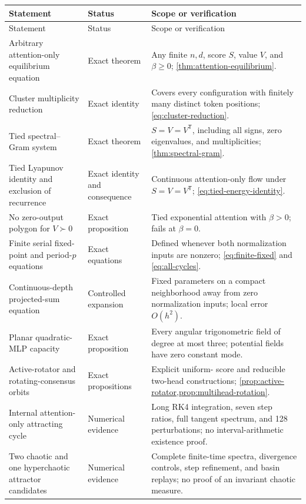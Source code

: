 \documentclass[11pt,a4paper]{article}
\theoremstyle{definition}
\newcommand{\T}{\mathsf T}
\begin{document}
\small
\begin{longtable}{p{}p{}p{}}
\toprule
Statement & Status & Scope or verification \\
\midrule
\endfirsthead
\toprule
Statement & Status & Scope or verification \\
\midrule
\endhead
Arbitrary attention-only equilibrium equation & Exact theorem & Any finite
$n,d$, score $S$, value $V$, and $\beta\geq0$; \cref{thm:attention-equilibrium}. \\
Cluster multiplicity reduction & Exact identity & Covers every configuration with
finitely many distinct token positions; \eqref{eq:cluster-reduction}. \\
Tied spectral--Gram system & Exact theorem & $S=V=V^{\T}$, including all signs,
zero eigenvalues, and multiplicities; \cref{thm:spectral-gram}. \\
Tied Lyapunov identity and exclusion of recurrence & Exact identity and consequence & Continuous
attention-only flow under $S=V=V^{\T}$; \eqref{eq:tied-energy-identity}. \\
No zero-output polygon for $V\succ0$ & Exact proposition & Tied exponential attention
with $\beta>0$; fails at $\beta=0$. \\
Finite serial fixed-point and period-$p$ equations & Exact equations & Defined
whenever both normalization inputs are nonzero; \eqref{eq:finite-fixed} and
\eqref{eq:all-cycles}. \\
Continuous-depth projected-sum equation & Controlled expansion & Fixed parameters on
a compact neighborhood away from zero normalization inputs; local error $O(h^2)$. \\
Planar quadratic-MLP capacity & Exact proposition & Every angular trigonometric field
of degree at most three; potential fields have zero constant mode. \\
Active-rotator and rotating-consensus orbits & Exact propositions & Explicit uniform-
score and reducible two-head constructions;
\cref{prop:active-rotator,prop:multihead-rotation}. \\
Internal attention-only attracting cycle & Numerical evidence & Long RK4 integration,
seven step ratios, full tangent spectrum, and 128 perturbations; no interval-arithmetic
existence proof. \\
Two chaotic and one hyperchaotic attractor candidates & Numerical evidence & Complete
finite-time spectra, divergence controls, step refinement, and basin replays; no
proof of an invariant chaotic measure. \\

\end{longtable}
\end{document}
